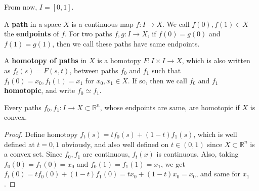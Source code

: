 From now, $I=[0,1]$.

\begin{defn} A \textbf{path} in a space $X$ is a continuous map $f:I\rightarrow X$. We call $f(0),f(1)\in X$ the \textbf{endpoints} of $f$. For two paths $f,g:I\rightarrow X$, if $f(0)=g(0)$ and $f(1)=g(1)$, then we call these paths have same endpoints.
\end{defn}

\begin{defn} A \textbf{homotopy of paths} in $X$ is a homotopy $F:I\times I\rightarrow X$, which is also written as $f_t(s)=F(s,t)$, between paths $f_0$ and $f_1$ such that $f_t(0)=x_0, f_t(1)=x_1$ for $x_0,x_1\in X$. If so, then we call $f_0$ and $f_1$ \textbf{homotopic}, and write $f_0\simeq f_1$.
\end{defn}

\begin{prop} Every paths $f_0,f_1:I\rightarrow X\subset \mathbb{R}^n$, whose endpoints are same, are homotopic if $X$ is convex.
\end{prop}
\begin{proof} Define homotopy $f_t(s)=tf_0(s)+(1-t)f_1(s)$, which is well defined at $t=0,1$ obviously, and also well defined on $t\in (0,1)$ since $X\subset \mathbb{R}^n$ is a convex set. Since $f_0,f_1$ are continuous, $f_t(x)$ is continuous. Also, taking $f_0(0)=f_1(0)=x_0$ and $f_0(1)=f_1(1)=x_1$, we get $f_t(0)=tf_0(0)+(1-t)f_1(0)=tx_0+(1-t)x_0=x_0$, and same for $x_1$.
\end{proof}

